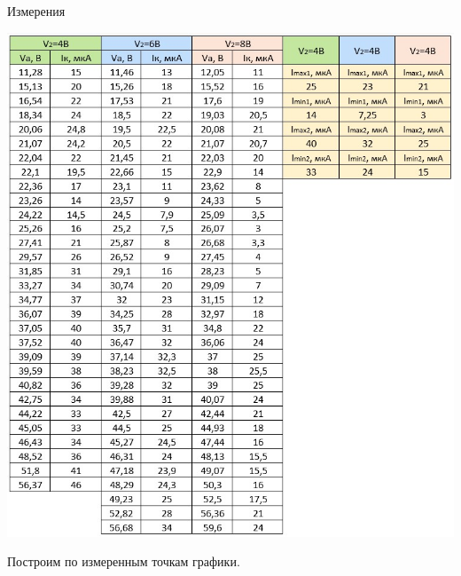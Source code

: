 \documentclass[a4paper,12pt]{article}
\begin{document}
    \begin{table}[h!]
        \caption{Измерения}
        \includegraphics[width=\linewidth]{2020-11-01}
    \end{table}
    \pagebreak
    Построим по измеренным точкам графики.
    
\end{document}
